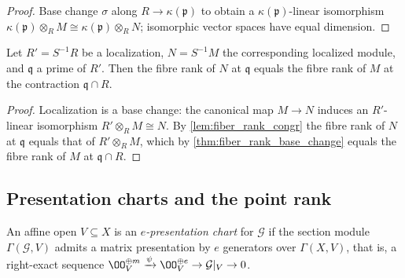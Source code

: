 \begin{proof}
  \leanok
  Base change \(\sigma\) along \(R \to \kappa(\mathfrak p)\) to obtain a
  \(\kappa(\mathfrak p)\)-linear isomorphism
  \(\kappa(\mathfrak p) \otimes_R M \cong \kappa(\mathfrak p) \otimes_R N\);
  isomorphic vector spaces have equal dimension.
\end{proof}

\begin{corollary}
  \label{cor:fiber_rank_localized}
  \leanok
  Let \(R' = S^{-1}R\) be a localization, \(N = S^{-1}M\) the corresponding
  localized module, and \(\mathfrak q\) a prime of \(R'\).  Then the fibre
  rank of \(N\) at \(\mathfrak q\) equals the fibre rank of \(M\) at the
  contraction \(\mathfrak q \cap R\).
\end{corollary}

\begin{proof}
  \leanok
  Localization is a base change: the canonical map \(M \to N\) induces an
  \(R'\)-linear isomorphism \(R' \otimes_R M \cong N\).  By
  \cref{lem:fiber_rank_congr} the fibre rank of \(N\) at \(\mathfrak q\)
  equals that of \(R' \otimes_R M\), which by \cref{thm:fiber_rank_base_change}
  equals the fibre rank of \(M\) at \(\mathfrak q \cap R\).
\end{proof}

\subsection{Presentation charts and the point rank}

\begin{definition}
  \label{def:presentation_chart}
  \leanok
  An affine open \(V \subseteq X\) is an \emph{\(e\)-presentation chart} for
  \(\mathcal G\) if the section module \(\Gamma(\mathcal G, V)\) admits a
  matrix presentation by \(e\) generators over \(\Gamma(X, V)\), that is, a
  right-exact sequence
  \(\OO_V^{\oplus m} \xrightarrow{\psi} \OO_V^{\oplus e}
    \to \mathcal G|_V \to 0\).
\end{definition}

